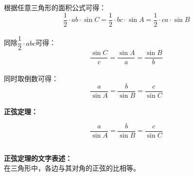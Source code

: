 \documentclass[UTF8]{ctexart}
\begin{document}
\newpage

    根据任意三角形的面积公式可得：\vspace{5pt}
    \begin{equation}
        \frac{1}{2}\cdot ab \cdot \sin{C}=\frac{1}{2}\cdot bc \cdot \sin{A}=\frac{1}{2}\cdot ca \cdot \sin{B}
    \end{equation}\\
    同除$\dfrac{1}{2}\cdot abc$可得：
    \begin{equation}
        \frac{\sin{C}}{c}=\frac{\sin{A}}{a}=\frac{\sin{B}}{b}
    \end{equation}\\
    同时取倒数可得：
    \begin{equation}
        \frac{a}{\sin{A}}=\frac{b}{\sin{B}}=\frac{c}{\sin{C}}
    \end{equation}\\[4mm]
    \textbf{正弦定理：}\vspace{5pt}
    \begin{large}
        \begin{equation*}
            \frac{a}{\sin{A}}=\frac{b}{\sin{B}}=\frac{c}{\sin{C}}
        \end{equation*}
    \end{large}\\
    \textbf{正弦定理的文字表述：}\\[2mm]
    在三角形中，各边与其对角的正弦的比相等。


\newpage
\end{document}
